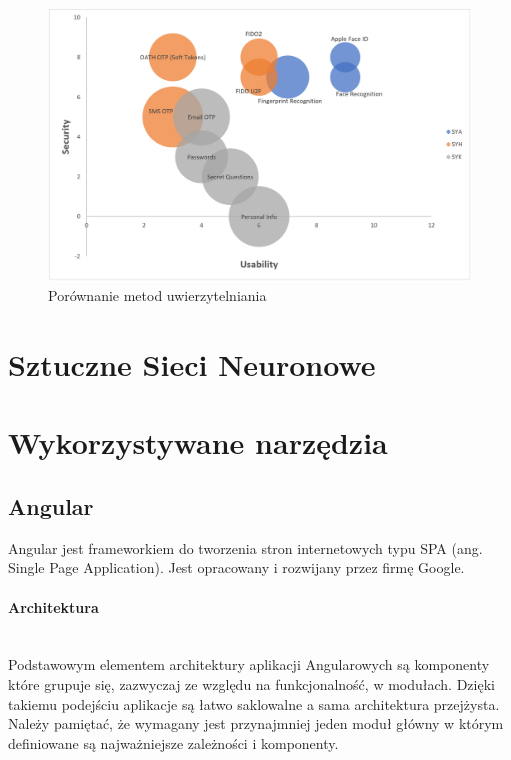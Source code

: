 \begin{figure}[ht]
	\centering
		\includegraphics[width=1\linewidth]{imgs/wyk1.png}
	\caption{Porównanie metod uwierzytelniania}
	\label{fig:metody-uwierzytelniania-porownanie}
\end{figure}


\section{Sztuczne Sieci Neuronowe}
\section{Wykorzystywane narzędzia}
\subsection{Angular}

Angular jest frameworkiem do tworzenia stron internetowych typu SPA (ang. Single Page Application). Jest opracowany i rozwijany przez firmę Google. 
\paragraph{Architektura}\mbox{}\\
Podstawowym elementem architektury aplikacji Angularowych są komponenty które grupuje się, zazwyczaj ze względu na funkcjonalność, w modułach. Dzięki takiemu podejściu aplikacje są łatwo saklowalne a sama architektura przejżysta. Należy pamiętać, że wymagany jest przynajmniej jeden moduł główny w którym definiowane są najważniejsze zależności i komponenty.

